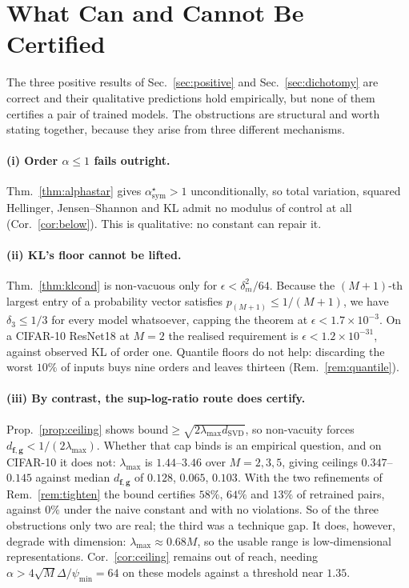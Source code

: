 \documentclass[10pt,letterpaper,twocolumn]{article}
\newcommand{\bff}{\mathbf{f}}
\newcommand{\bfg}{\mathbf{g}}
\newcommand{\dSVD}{d_{\mathrm{SVD}}}
\newcommand{\dfg}{d_{\bff,\bfg}}
\theoremstyle{plain}
\theoremstyle{definition}
\theoremstyle{remark}
\begin{document}
\section{What Can and Cannot Be Certified}
\label{sec:cannot}

The three positive results of Sec.~\ref{sec:positive} and
Sec.~\ref{sec:dichotomy} are correct and their qualitative predictions hold
empirically, but none of them certifies a pair of trained models. The
obstructions are structural and worth stating together, because they arise from
three different mechanisms.

\paragraph{(i) Order $\alpha\le1$ fails outright.}
Thm.~\ref{thm:alphastar} gives $\alpha^{\star}_{\mathrm{sym}}>1$
unconditionally, so total variation, squared Hellinger, Jensen--Shannon and KL
admit no modulus of control at all (Cor.~\ref{cor:below}). This is
qualitative: no constant can repair it.

\paragraph{(ii) KL's floor cannot be lifted.}
Thm.~\ref{thm:klcond} is non-vacuous only for
$\epsilon<\delta_{m}^{2}/64$. Because the $(M{+}1)$-th largest entry of a
probability vector satisfies $p_{(M+1)}\le1/(M+1)$, we have
$\delta_{3}\le1/3$ for every model whatsoever, capping the theorem at
$\epsilon<1.7\times10^{-3}$. On a CIFAR-10 ResNet18 at $M=2$ the realised
requirement is $\epsilon<1.2\times10^{-31}$, against observed KL of order one.
Quantile floors do not help: discarding the worst $10\%$ of inputs buys nine
orders and leaves thirteen (Rem.~\ref{rem:quantile}).

\paragraph{(iii) By contrast, the sup-log-ratio route does certify.}
Prop.~\ref{prop:ceiling} shows $\mathrm{bound}\ge\sqrt{2\lambda_{\max}\dSVD}$,
so non-vacuity forces $\dfg<1/(2\lambda_{\max})$. Whether that cap binds is an
empirical question, and on CIFAR-10 it does not: $\lambda_{\max}$ is
$1.44$--$3.46$ over $M=2,3,5$, giving ceilings $0.347$--$0.145$ against median
$\dfg$ of $0.128$, $0.065$, $0.103$. With the two refinements of
Rem.~\ref{rem:tighten} the bound certifies $58\%$, $64\%$ and $13\%$ of
retrained pairs, against $0\%$ under the naive constant and with no violations.
So of the three obstructions only two are real; the third was a technique gap.
It does, however, degrade with dimension: $\lambda_{\max}\approx0.68M$, so the
usable range is low-dimensional representations. Cor.~\ref{cor:ceiling} remains out of reach, needing
$\alpha>4\sqrt{M}\Delta/\psi_{\min}=64$ on these models against a threshold
near $1.35$.
\end{document}
